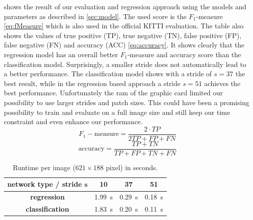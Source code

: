  shows the result of our evaluation and regression
approach using the models and parameters as described in \cref{sec:model}. The
used score is the $F_1$-measure \cref{eq:fMeasure} which is also used in the
official KITTI evaluation. The table also shows the values of true positive
(TP), true negative (TN), false positive (FP), false negative (FN) and accuracy
(ACC) \cref{eq:accuracy}. It shows clearly that the regression model has an
overall better $F_1$-measure and accuracy score than the classification model.
Surprisingly, a smaller stride does not automatically lead to a better
performance. The classification model shows with a stride of $s=37$ the
best result, while in the regression based approach a stride $s=51$ achieves the
best performance. Unfortunately the ram of the graphic card limited our
possibility to use larger strides and patch sizes. This could have been a
promising possibility to train and evaluate on a full image size and still keep
our time constraint and even enhance our performance.\\

\begin{equation} \label{eq:fMeasure}
F_1-\text{measure} = \frac{2 \cdot TP}{2TP +FP +FN}
\end{equation}
\begin{equation} \label{eq:accuracy}
\text{accuracy} = \frac{TP + TN}{TP + FP + TN + FN}
\end{equation}

\begin{table}[]
    \begin{center}
        \begin{tabular}{c|ccc}
            \toprule
            \textbf{network type / stride $\bm{s}$} & 10 & 37 & 51 \\
            \midrule
            \textbf{regression}     & \SI{1.99}{\second} & \SI{0.29}{\second} & \SI{0.18}{\second} \\
            \textbf{classification} & \SI{1.83}{\second} & \SI{0.20}{\second}  & \SI{0.11}{\second}\\
            \bottomrule
        \end{tabular}
        \caption{Runtime per image ($621 \times 188$ pixel) in seconds.}
        \label{tab:runtime}
    \end{center}
\end{table}

